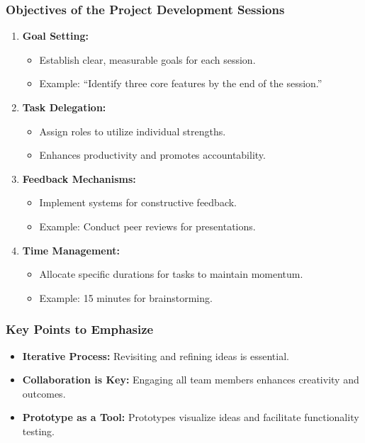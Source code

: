 \documentclass[aspectratio=169]{beamer}
\begin{document}
\begin{frame}[fragile]
    \frametitle{Objectives of the Project Development Sessions}
    \begin{enumerate}
        \item \textbf{Goal Setting:}
        \begin{itemize}
            \item Establish clear, measurable goals for each session.
            \item Example: “Identify three core features by the end of the session.”
        \end{itemize}
        
        \item \textbf{Task Delegation:}
        \begin{itemize}
            \item Assign roles to utilize individual strengths.
            \item Enhances productivity and promotes accountability.
        \end{itemize}

        \item \textbf{Feedback Mechanisms:}
        \begin{itemize}
            \item Implement systems for constructive feedback.
            \item Example: Conduct peer reviews for presentations.
        \end{itemize}

        \item \textbf{Time Management:}
        \begin{itemize}
            \item Allocate specific durations for tasks to maintain momentum.
            \item Example: 15 minutes for brainstorming.
        \end{itemize}
    \end{enumerate}
\end{frame}

\begin{frame}[fragile]
    \frametitle{Key Points to Emphasize}
    \begin{itemize}
        \item \textbf{Iterative Process:} Revisiting and refining ideas is essential.
        \item \textbf{Collaboration is Key:} Engaging all team members enhances creativity and outcomes.
        \item \textbf{Prototype as a Tool:} Prototypes visualize ideas and facilitate functionality testing.
    \end{itemize}
\end{frame}
\end{document}
